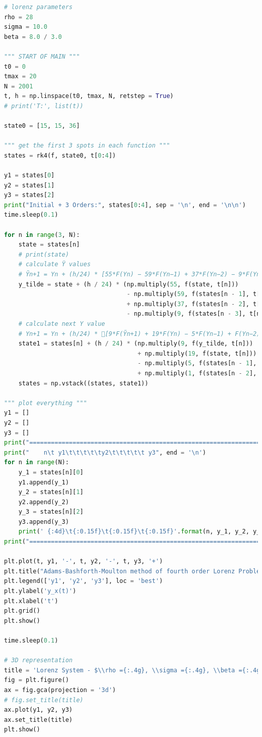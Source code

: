 \documentclass[11pt]{article}
\begin{document}
\begin{lstlisting}[language=Python]
# lorenz parameters
rho = 28
sigma = 10.0
beta = 8.0 / 3.0

""" START OF MAIN """
t0 = 0
tmax = 20
N = 2001
t, h = np.linspace(t0, tmax, N, retstep = True)
# print('T:', list(t))

state0 = [15, 15, 36]

""" get the first 3 spots in each function """
states = rk4(f, state0, t[0:4])

y1 = states[0]
y2 = states[1]
y3 = states[2]
print("Initial + 3 Orders:", states[0:4], sep = '\n', end = '\n\n')
time.sleep(0.1)

for n in range(3, N):
    state = states[n]
    # print(state)
    # calculate Ÿ values
    # Ỹn+1 = Yn + (h/24) * [55*F(Yn) − 59*F(Yn−1) + 37*F(Yn−2) − 9*F(Yn−3)]
    y_tilde = state + (h / 24) * (np.multiply(55, f(state, t[n]))
                                  - np.multiply(59, f(states[n - 1], t[n]))
                                  + np.multiply(37, f(states[n - 2], t[n]))
                                  - np.multiply(9, f(states[n - 3], t[n])))
    # calculate next Y value
    # Yn+1 = Yn + (h/24) * 􏰆[9*F(Ỹn+1) + 19*F(Yn) − 5*F(Yn−1) + F(Yn−2)􏰇]
    state1 = states[n] + (h / 24) * (np.multiply(9, f(y_tilde, t[n]))
                                     + np.multiply(19, f(state, t[n]))
                                     - np.multiply(5, f(states[n - 1], t[n]))
                                     + np.multiply(1, f(states[n - 2], t[n])))
    states = np.vstack((states, state1))

""" plot everything """
y1 = []
y2 = []
y3 = []
print("=========================================================================")
print("    n\t y1\t\t\t\t\ty2\t\t\t\t\t y3", end = '\n')
for n in range(N):
    y_1 = states[n][0]
    y1.append(y_1)
    y_2 = states[n][1]
    y2.append(y_2)
    y_3 = states[n][2]
    y3.append(y_3)
    print(' {:4d}\t{:0.15f}\t{:0.15f}\t{:0.15f}'.format(n, y_1, y_2, y_3))
print("=========================================================================")

plt.plot(t, y1, '-', t, y2, '-', t, y3, '+')
plt.title("Adams-Bashforth-Moulton method of fourth order Lorenz Problem")
plt.legend(['y1', 'y2', 'y3'], loc = 'best')
plt.ylabel('y_x(t)')
plt.xlabel('t')
plt.grid()
plt.show()

time.sleep(0.1)

# 3D representation
title = 'Lorenz System - $\\rho ={:.4g}, \\sigma ={:.4g}, \\beta ={:.4g}$'.format(rho, sigma, beta)
fig = plt.figure()
ax = fig.gca(projection = '3d')
# fig.set_title(title)
ax.plot(y1, y2, y3)
ax.set_title(title)
plt.show()

\end{lstlisting} 
\end{document}

